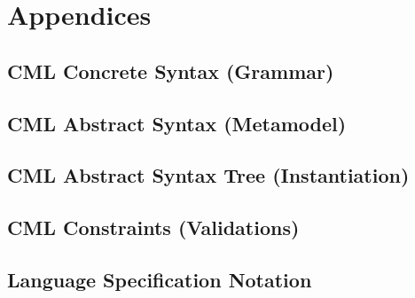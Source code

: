 \documentclass[a4paper,oneside,12pt, extrafontsizes]{memoir}
\theoremstyle{definition}
\theoremstyle{definition}
\theoremstyle{definition}
\theoremstyle{definition}
\begin{document}
\part{Appendices}

\appendix

\chapter{CML Concrete Syntax (Grammar)}
\label{apx:concrete-syntax}


\chapter{CML Abstract Syntax (Metamodel)}
\label{apx:abstract-syntax}


\chapter{CML Abstract Syntax Tree (Instantiation)}
\label{apx:ast}


\chapter{CML Constraints (Validations)}
\label{apx:ocl}


\chapter{Language Specification Notation}
\label{apx:lsl}


\backmatter



\end{document}
